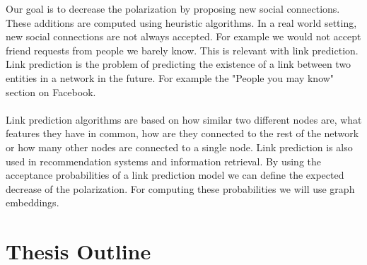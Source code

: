 \noindent Our goal is to decrease the polarization by proposing new social connections. These additions are computed using heuristic algorithms. In a real world setting, new social connections are not always accepted.  For example we would not accept friend requests from people we barely know. This is relevant with link prediction. Link prediction is the problem of predicting the existence of a link between two entities in a network in the future. For example the "People you may know" section on Facebook.		
\\		
\\		
Link prediction algorithms are based on how similar two different nodes are, what features they have in common, how are they connected to the rest of the network or how many other nodes are connected to a single node. Link prediction is also used in recommendation systems and  information retrieval. By using the acceptance probabilities of a link prediction model we can define the expected decrease of the polarization. For computing these probabilities we will use graph embeddings.


\section{Thesis Outline}
\label{sec:outline}

